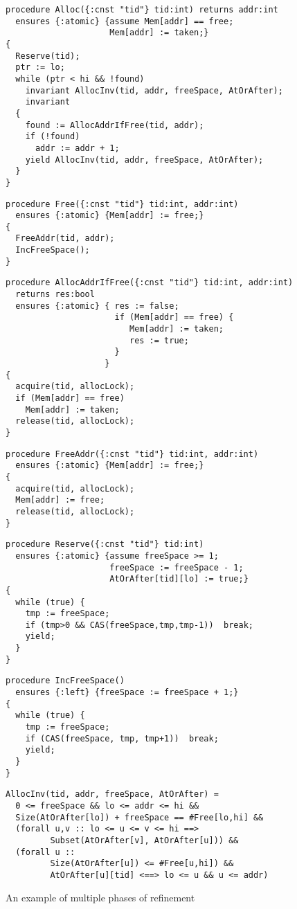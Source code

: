 \begin{figure}
\begin{small}
\begin{verbatim}
procedure Alloc({:cnst "tid"} tid:int) returns addr:int
  ensures {:atomic} {assume Mem[addr] == free;  
                     Mem[addr] := taken;}
{
  Reserve(tid);         
  ptr := lo;
  while (ptr < hi && !found)
    invariant AllocInv(tid, addr, freeSpace, AtOrAfter);
    invariant 
  { 
    found := AllocAddrIfFree(tid, addr);
    if (!found) 
      addr := addr + 1;
    yield AllocInv(tid, addr, freeSpace, AtOrAfter);
  }
}
\end{verbatim}
\begin{verbatim}
procedure Free({:cnst "tid"} tid:int, addr:int)
  ensures {:atomic} {Mem[addr] := free;}
{
  FreeAddr(tid, addr);  
  IncFreeSpace(); 
}
\end{verbatim}
\begin{verbatim}
procedure AllocAddrIfFree({:cnst "tid"} tid:int, addr:int) 
  returns res:bool
  ensures {:atomic} { res := false;
                      if (Mem[addr] == free) {
                         Mem[addr] := taken; 
                         res := true;
                      }  
                    }
{
  acquire(tid, allocLock);
  if (Mem[addr] == free)
    Mem[addr] := taken;   
  release(tid, allocLock);
}
\end{verbatim}
\begin{verbatim}
procedure FreeAddr({:cnst "tid"} tid:int, addr:int)
  ensures {:atomic} {Mem[addr] := free;}
{
  acquire(tid, allocLock);
  Mem[addr] := free;   
  release(tid, allocLock);
}
\end{verbatim}
\begin{verbatim}
procedure Reserve({:cnst "tid"} tid:int) 
  ensures {:atomic} {assume freeSpace >= 1; 
                     freeSpace := freeSpace - 1;
                     AtOrAfter[tid][lo] := true;}
{
  while (true) {
    tmp := freeSpace;
    if (tmp>0 && CAS(freeSpace,tmp,tmp-1))  break;
    yield;
  }
}
\end{verbatim}
\begin{verbatim}
procedure IncFreeSpace() 
  ensures {:left} {freeSpace := freeSpace + 1;}
{
  while (true) {
    tmp := freeSpace;
    if (CAS(freeSpace, tmp, tmp+1))  break;
    yield;
  }
}
\end{verbatim}
\begin{verbatim}
AllocInv(tid, addr, freeSpace, AtOrAfter) = 
  0 <= freeSpace && lo <= addr <= hi &&
  Size(AtOrAfter[lo]) + freeSpace == #Free[lo,hi] && 
  (forall u,v :: lo <= u <= v <= hi ==> 
         Subset(AtOrAfter[v], AtOrAfter[u])) &&
  (forall u :: 
         Size(AtOrAfter[u]) <= #Free[u,hi]) &&
         AtOrAfter[u][tid] <==> lo <= u && u <= addr)
\end{verbatim}
\end{small}
\caption{An example of multiple phases of refinement}
\label{fig:refinement}
\end{figure}


